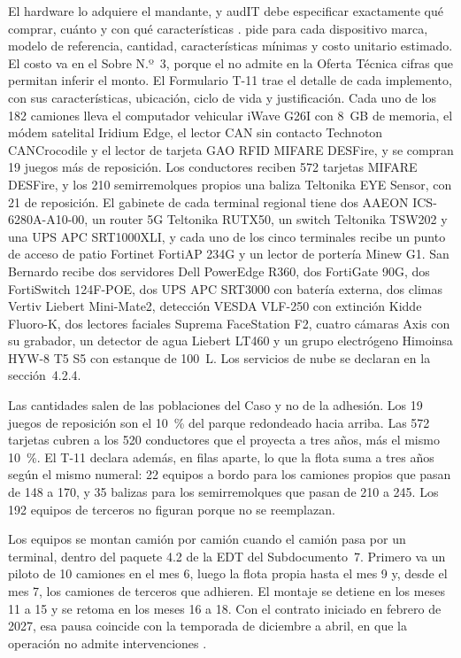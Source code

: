 El hardware lo adquiere el mandante, y audIT debe especificar exactamente qué comprar, cuánto y con
qué características .  pide para cada dispositivo marca,
modelo de referencia, cantidad, características mínimas y costo unitario estimado. El costo va en el
Sobre N.º~3, porque el  no admite en la Oferta Técnica cifras que permitan inferir el
monto. El Formulario T-11 trae el detalle de cada
implemento, con sus características, ubicación, ciclo de vida y justificación. Cada uno de los 182 camiones lleva el computador vehicular iWave G26I con 8~GB de memoria, el
módem satelital Iridium Edge, el lector CAN sin contacto Technoton CANCrocodile y el lector de tarjeta
GAO RFID MIFARE DESFire, y se compran 19 juegos más de reposición. Los conductores reciben 572 tarjetas
MIFARE DESFire, y los 210 semirremolques propios una baliza Teltonika EYE Sensor, con 21 de reposición.
El gabinete de cada terminal regional tiene dos AAEON ICS-6280A-A10-00, un router 5G Teltonika RUTX50, un
switch Teltonika TSW202 y una UPS APC SRT1000XLI, y cada uno de los cinco terminales recibe un punto de
acceso de patio Fortinet FortiAP 234G y un lector de portería Minew G1. San Bernardo recibe dos
servidores Dell PowerEdge R360, dos FortiGate 90G, dos FortiSwitch 124F-POE, dos UPS APC SRT3000 con
batería externa, dos climas Vertiv Liebert Mini-Mate2, detección VESDA VLF-250 con extinción Kidde
Fluoro-K, dos lectores faciales Suprema FaceStation F2, cuatro cámaras Axis con su grabador, un detector
de agua Liebert LT460 y un grupo electrógeno Himoinsa HYW-8 T5 S5 con estanque de 100~L. Los servicios
de nube se declaran en la sección~4.2.4.

Las cantidades salen de las poblaciones del Caso y no de la adhesión. Los 19 juegos de reposición son el
10~\% del parque redondeado hacia arriba. Las 572 tarjetas cubren a los 520 conductores que el
 proyecta a tres años, más el mismo 10~\%. El T-11 declara además, en filas
aparte, lo que la flota suma a tres años según el mismo numeral: 22 equipos a bordo para los camiones
propios que pasan de 148 a 170, y 35 balizas para los semirremolques que pasan de 210 a 245. Los 192
equipos de terceros no figuran porque no se reemplazan.

Los equipos se montan camión por camión cuando el camión pasa por un terminal, dentro del paquete 4.2
de la EDT del Subdocumento~7. Primero va un piloto de 10 camiones en el mes 6, luego la flota propia
hasta el mes 9 y, desde el mes 7, los camiones de terceros que adhieren. El montaje se detiene en los
meses 11 a 15 y se retoma en los meses 16 a 18. Con el contrato iniciado en febrero de 2027, esa pausa
coincide con la temporada de diciembre a abril, en que la operación no admite intervenciones
.

